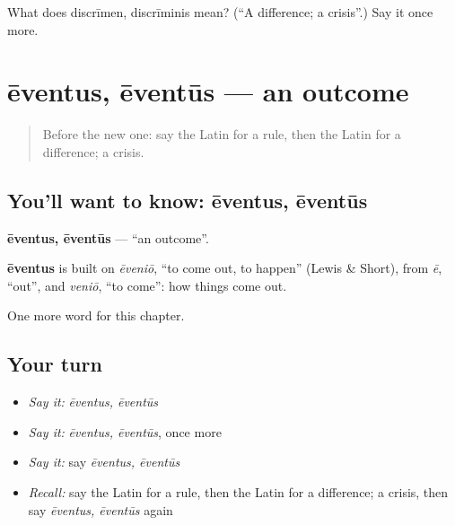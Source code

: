 \begin{tcolorbox}[breakable,colback=teal!4,colframe=teal!35!black,title={Before you move on}]
What does discrīmen, discrīminis mean? (\textquotedblleft{}A difference; a crisis\textquotedblright{}.) Say it once more.
\end{tcolorbox}
\section[ēventus, ēventūs]{ēventus, ēventūs — an outcome}

\label{lesson:LA-C221-eventus}



\begin{quote}
Before the new one: say the Latin for a rule, then the Latin for a difference; a crisis.
\end{quote}

\subsection*{You'll want to know: ēventus, ēventūs}
\textbf{ēventus, ēventūs} — \textquotedblleft{}an outcome\textquotedblright{}.

\begin{cousinweb}
\textbf{ēventus} is built on \emph{ēveniō}, \textquotedblleft{}to come out, to happen\textquotedblright{} (Lewis \& Short), from \emph{ē}, \textquotedblleft{}out\textquotedblright{}, and \emph{veniō}, \textquotedblleft{}to come\textquotedblright{}: how things come out.
\end{cousinweb}

\begin{grammarlens}[title={What you've built}]
One more word for this chapter.
\end{grammarlens}

\subsection*{Your turn}
\begin{itemize}
\raggedright
  \item \emph{Say it:} \emph{ēventus, ēventūs}
  \item \emph{Say it:} \emph{ēventus, ēventūs}, once more
  \item \emph{Say it:} say \emph{ēventus, ēventūs}
  \item \emph{Recall:} say the Latin for a rule, then the Latin for a difference; a crisis, then say \emph{ēventus, ēventūs} again
\end{itemize}

